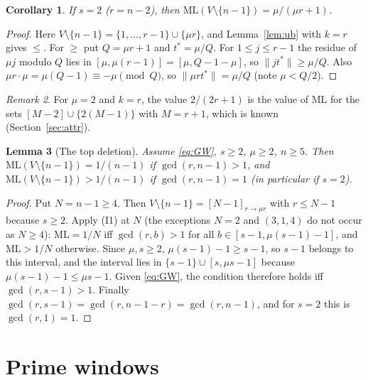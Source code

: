 \documentclass[11pt]{article}
\newtheorem{lemma}{Lemma}
\newtheorem{corollary}[lemma]{Corollary}
\theoremstyle{remark}
\newtheorem{remark}[lemma]{Remark}
\newcommand{\norm}[1]{\lVert #1\rVert}
\newcommand{\ML}{\mathrm{ML}}
\begin{document}
\begin{corollary}\label{cor:s2}
If $s=2$ ($r=n-2$), then $\ML(V\setminus\{n-1\})=\mu/(\mu r+1)$.
\end{corollary}
\begin{proof}
Here $V\setminus\{n-1\}=\{1,\dots,r-1\}\cup\{\mu r\}$, and Lemma~\ref{lem:ub} with $k=r$ gives $\le$. For $\ge$ put $Q=\mu r+1$ and $t^*=\mu/Q$. For $1\le j\le r-1$ the residue of $\mu j$ modulo $Q$ lies in $[\mu,\mu(r-1)]=[\mu,Q-1-\mu]$, so $\norm{jt^*}\ge\mu/Q$. Also $\mu r\cdot\mu=\mu(Q-1)\equiv-\mu\pmod Q$, so $\norm{\mu rt^*}=\mu/Q$ (note $\mu<Q/2$).
\end{proof}

\begin{remark}
For $\mu=2$ and $k=r$, the value $2/(2r+1)$ is the value of $\ML$ for the sets $[M-2]\cup\{2(M-1)\}$ with $M=r+1$, which is known (Section~\ref{sec:attr}).
\end{remark}

\begin{lemma}[The top deletion]\label{lem:top}
Assume \eqref{eq:GW}, $s\ge2$, $\mu\ge2$, $n\ge5$. Then $\ML(V\setminus\{n-1\})=1/(n-1)$ if $\gcd(r,n-1)>1$, and $\ML(V\setminus\{n-1\})>1/(n-1)$ if $\gcd(r,n-1)=1$ (in particular if $s=2$).
\end{lemma}
\begin{proof}
Put $N=n-1\ge4$. Then $V\setminus\{n-1\}=[N-1]_{r\to\mu r}$ with $r\le N-1$ because $s\ge2$. Apply (I1) at $N$ (the exceptions $N=2$ and $(3,1,4)$ do not occur as $N\ge4$): $\ML=1/N$ iff $\gcd(r,b)>1$ for all $b\in[s-1,\mu(s-1)-1]$, and $\ML>1/N$ otherwise. Since $\mu,s\ge2$, $\mu(s-1)-1\ge s-1$, so $s-1$ belongs to this interval, and the interval lies in $\{s-1\}\cup[s,\mu s-1]$ because $\mu(s-1)-1\le\mu s-1$. Given \eqref{eq:GW}, the condition therefore holds iff $\gcd(r,s-1)>1$. Finally $\gcd(r,s-1)=\gcd(r,n-1-r)=\gcd(r,n-1)$, and for $s=2$ this is $\gcd(r,1)=1$.
\end{proof}

\section{Prime windows}\label{sec:windows}
\end{document}

